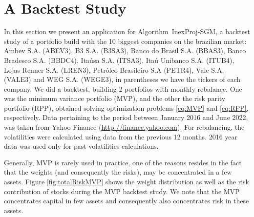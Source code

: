 \section{A Backtest Study}

In this section we present an application for Algorithm~InexProj-SGM, a backtest study of a portfolio build with the 10 biggest companies on the brazilian market: Ambev S.A. (ABEV3), B3 S.A. (B3SA3), Banco do Brasil S.A. (BBAS3), Banco Bradesco S.A. (BBDC4), Itaúsa S.A. (ITSA3), Itaú Unibanco S.A. (ITUB4), Lojas Renner S.A. (LREN3), Petróleo Brasileiro S.A (PETR4), Vale S.A. (VALE3) and WEG S.A. (WEGE3), in parentheses we have the tickers of each company.  We did a backtest, building 2 portfolios with monthly rebalance. One was the minimum variance portfolio (MVP), and the other the risk parity portfolio (RPP),  obtained solving optimization problems \eqref{eq:MVP} and \eqref{eq:RPP}, respectively. Data pertaining to the period between January 2016  and June 2022, was taken from Yahoo Finance (\url{http://finance.yahoo.com}). For rebalancing, the volatilities were calculated using data from the previous 12 months. 2016 year data was used only for past volatilities calculations.

Generally, MVP is rarely used in practice, one of the reasons resides in the fact that the weights (and consequently the risks), may be concentrated in a few assets. Figure \ref{fig:totalRiskMVP} shows the weight distribution as well as the risk contribution of stocks during the MVP backtest study. We note that the MVP concentrates capital in few assets and consequently also concentrates risk in these assets.


